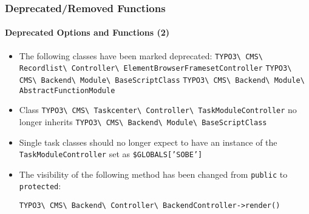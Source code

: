\begin{frame}[fragile]
	\frametitle{Deprecated/Removed Functions}
	\framesubtitle{Deprecated Options and Functions (2)}

	\begin{itemize}
		\item The following classes have been marked deprecated:
			\smaller
			\texttt{TYPO3\textbackslash
				CMS\textbackslash
				Recordlist\textbackslash
				Controller\textbackslash
				ElementBrowserFramesetController}
			\newline
			\texttt{TYPO3\textbackslash
				CMS\textbackslash
				Backend\textbackslash
				Module\textbackslash
				BaseScriptClass}
			\newline
			\texttt{TYPO3\textbackslash
				CMS\textbackslash
				Backend\textbackslash
				Module\textbackslash
				AbstractFunctionModule}
			\normalsize

		\item Class
			\smaller
			\texttt{TYPO3\textbackslash
				CMS\textbackslash
				Taskcenter\textbackslash
				Controller\textbackslash
				TaskModuleController}
			\normalsize\newline
			no longer inherits
			\smaller
			\texttt{TYPO3\textbackslash
				CMS\textbackslash
				Backend\textbackslash
				Module\textbackslash
				BaseScriptClass}
			\normalsize

		\item Single task classes should no longer expect to have an instance of
			the \texttt{TaskModuleController} set as \texttt{\$GLOBALS['SOBE']}

		\item The visibility of the following method has been changed\newline
			from \texttt{public} to \texttt{protected}:

			\smaller
			\texttt{TYPO3\textbackslash
				CMS\textbackslash
				Backend\textbackslash
				Controller\textbackslash
				BackendController->render()}

	\end{itemize}

\end{frame}


